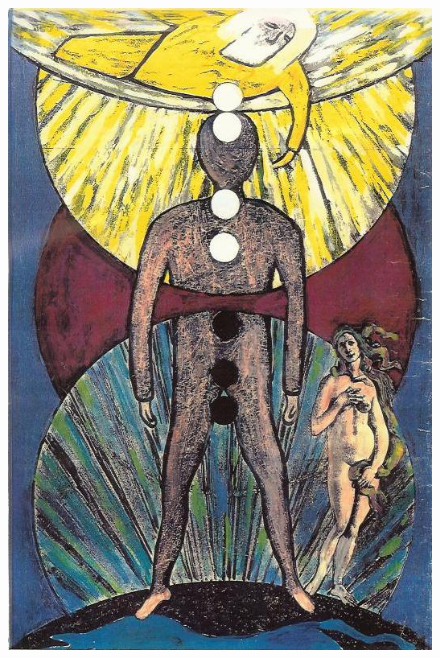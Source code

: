 \documentclass[12pt,letterpaper]{article}
\begin{document}
\begin{figure} \centering
  \includegraphics[width=1.1\textwidth]{back.jpg}
\end{figure}
\end{document}
